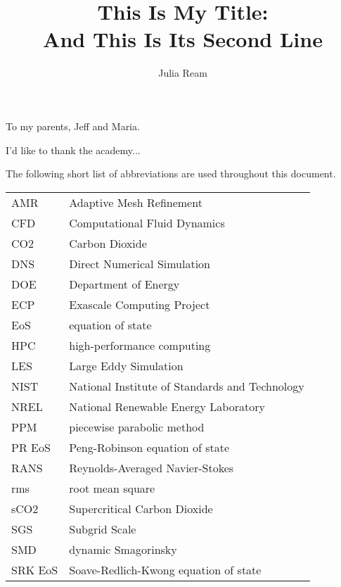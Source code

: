\documentclass[11pt,expanded,copyright]{fsuthesis}
\title{This Is My Title:\protect\\And This Is Its Second Line}
\author{Julia Ream}
\begin{document}
\frontmatter
\maketitle
\makecommitteepage

\begin{dedication}
To my parents, Jeff and Maria. 
\end{dedication}

\begin{acknowledgments}
I'd like to thank the academy...
\end{acknowledgments}

\tableofcontents
\listoffigures



\begin{listofabbrevs}
The following short list of abbreviations are used throughout this document. 
\begin{center}
\begin{tabular}{ll}
AMR& Adaptive Mesh Refinement \\
CFD& Computational Fluid Dynamics \\
CO2& Carbon Dioxide \\
DNS& Direct Numerical Simulation \\
DOE& Department of Energy \\
ECP& Exascale Computing Project \\
EoS& equation of state \\
HPC& high-performance computing \\
LES& Large Eddy Simulation \\
NIST& National Institute of Standards and Technology \\
NREL& National Renewable Energy Laboratory \\
PPM& piecewise parabolic method \\
PR EoS& Peng-Robinson equation of state \\
RANS& Reynolds-Averaged Navier-Stokes \\
rms& root mean square \\
sCO2& Supercritical Carbon Dioxide \\
SGS& Subgrid Scale \\
SMD& dynamic Smagorinsky \\
SRK EoS&Soave-Redlich-Kwong equation of state \\





\end{tabular}
\end{center}
\end{listofabbrevs}
\end{document}
